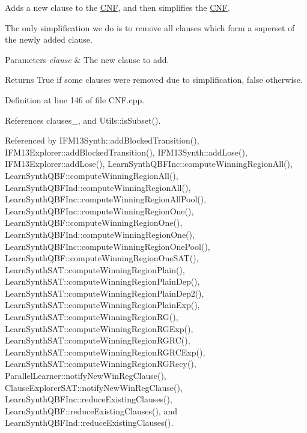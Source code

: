 Adds a new clause to the \hyperlink{classCNF}{C\-N\-F}, and then simplifies the \hyperlink{classCNF}{C\-N\-F}. 

The only simplification we do is to remove all clauses which form a superset of the newly added clause.


\begin{DoxyParams}{Parameters}
{\em clause} & The new clause to add. \\
\hline
\end{DoxyParams}
\begin{DoxyReturn}{Returns}
True if some clauses were removed due to simplification, false otherwise. 
\end{DoxyReturn}


Definition at line 146 of file C\-N\-F.\-cpp.



References clauses\-\_\-, and Utils\-::is\-Subset().



Referenced by I\-F\-M13\-Synth\-::add\-Blocked\-Transition(), I\-F\-M13\-Explorer\-::add\-Blocked\-Transition(), I\-F\-M13\-Synth\-::add\-Lose(), I\-F\-M13\-Explorer\-::add\-Lose(), Learn\-Synth\-Q\-B\-F\-Inc\-::compute\-Winning\-Region\-All(), Learn\-Synth\-Q\-B\-F\-::compute\-Winning\-Region\-All(), Learn\-Synth\-Q\-B\-F\-Ind\-::compute\-Winning\-Region\-All(), Learn\-Synth\-Q\-B\-F\-Inc\-::compute\-Winning\-Region\-All\-Pool(), Learn\-Synth\-Q\-B\-F\-Inc\-::compute\-Winning\-Region\-One(), Learn\-Synth\-Q\-B\-F\-::compute\-Winning\-Region\-One(), Learn\-Synth\-Q\-B\-F\-Ind\-::compute\-Winning\-Region\-One(), Learn\-Synth\-Q\-B\-F\-Inc\-::compute\-Winning\-Region\-One\-Pool(), Learn\-Synth\-Q\-B\-F\-::compute\-Winning\-Region\-One\-S\-A\-T(), Learn\-Synth\-S\-A\-T\-::compute\-Winning\-Region\-Plain(), Learn\-Synth\-S\-A\-T\-::compute\-Winning\-Region\-Plain\-Dep(), Learn\-Synth\-S\-A\-T\-::compute\-Winning\-Region\-Plain\-Dep2(), Learn\-Synth\-S\-A\-T\-::compute\-Winning\-Region\-Plain\-Exp(), Learn\-Synth\-S\-A\-T\-::compute\-Winning\-Region\-R\-G(), Learn\-Synth\-S\-A\-T\-::compute\-Winning\-Region\-R\-G\-Exp(), Learn\-Synth\-S\-A\-T\-::compute\-Winning\-Region\-R\-G\-R\-C(), Learn\-Synth\-S\-A\-T\-::compute\-Winning\-Region\-R\-G\-R\-C\-Exp(), Learn\-Synth\-S\-A\-T\-::compute\-Winning\-Region\-R\-G\-Recy(), Parallel\-Learner\-::notify\-New\-Win\-Reg\-Clause(), Clause\-Explorer\-S\-A\-T\-::notify\-New\-Win\-Reg\-Clause(), Learn\-Synth\-Q\-B\-F\-Inc\-::reduce\-Existing\-Clauses(), Learn\-Synth\-Q\-B\-F\-::reduce\-Existing\-Clauses(), and Learn\-Synth\-Q\-B\-F\-Ind\-::reduce\-Existing\-Clauses().

